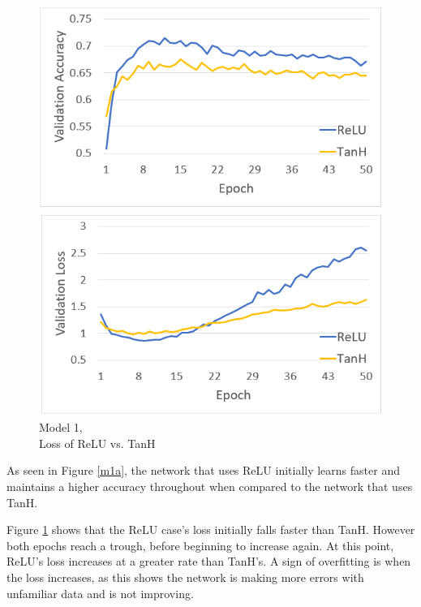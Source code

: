 \documentclass[a4paper, 11pt]{article}
\begin{document}
\begin{figure}[h]
\begin{minipage}{0.45\textwidth}
\captionsetup{justification=centering}
\centering
\includegraphics[scale=0.45]{1relucomp}
\caption[caption]{Model 1, \\ Accuracy of ReLU vs. TanH}
\label{m1a} %
\end{minipage}
\begin{minipage}{0.45\textwidth}
\captionsetup{justification=centering}
\centering
\includegraphics[scale=0.45]{1relucomploss}
\caption{Model 1,\\ Loss of ReLU vs. TanH}
\label{m1l}%
\end{minipage}
\end{figure}

As seen in Figure \ref{m1a}, the network that uses ReLU initially learns faster and maintains a higher accuracy throughout when compared to the network that uses TanH.

Figure \ref{m1l} shows that the ReLU case's loss initially falls faster than TanH. However both epochs reach a trough, before beginning to increase again. At this point, ReLU's loss increases at a greater rate than TanH's. A sign of overfitting is when the loss increases, as this shows the network is making more errors with unfamiliar data and is not improving.
\end{document}
